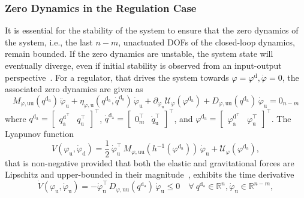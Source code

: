 \subsubsection{Zero Dynamics in the Regulation Case}
It is essential for the stability of the system to ensure that the zero dynamics of the system, i.e., the last $n-m$, unactuated \glspl{DOF} of the closed-loop dynamics, remain bounded. If the zero dynamics are unstable, the system state will eventually diverge, even if initial stability is observed from an input-output perspective~\citep{pustina2025analysis}.
For a regulator, that drives the system towards $\varphi = \varphi^\mathrm{d}, \dot{\varphi} = 0$, the associated zero dynamics are given as~\citep{pustina2025analysis}
\begin{equation}
    M_{\varphi,\mathrm{uu}}(q^{\mathrm{d}_\mathrm{a}}) \, \ddot{\varphi}_\mathrm{u} + \eta_{\varphi,\mathrm{u}}(q^{\mathrm{d}_\mathrm{a}},\dot{q}^{\mathrm{d}_\mathrm{a}}) \, \dot{\varphi}_\mathrm{u} + \partial_{\varphi_\mathrm{u}} \mathcal{U}_\varphi(\varphi^{\mathrm{d}_\mathrm{a}}) + D_{\varphi,\mathrm{uu}}(q^{\mathrm{d}_\mathrm{a}}) \, \dot{\varphi}_\mathrm{u} = 0_{n-m}
\end{equation}
where $q^{\mathrm{d}_\mathrm{a}} = \begin{bmatrix}
    q_\mathrm{a}^{\mathrm{d}^\top} & q_\mathrm{u}^{\top}
\end{bmatrix}^\top$, $\dot{q}^{\mathrm{d}_\mathrm{a}} = \begin{bmatrix}
    0_m^\top & \dot{q}_\mathrm{u}^{\top}
\end{bmatrix}^\top$, and $\varphi^{\mathrm{d}_\mathrm{a}} = \begin{bmatrix}
    \varphi_\mathrm{a}^{\mathrm{d}^\top} & \varphi_\mathrm{u}^{\top}
\end{bmatrix}^\top$.
The Lyapunov function
\begin{equation}
    V(\varphi_\mathrm{u},\dot{\varphi}_\mathrm{d}) = \frac{1}{2} \, \dot{\varphi}_\mathrm{u}^\top \, M_{\varphi,\mathrm{uu}}(h^{-1}(\varphi^{\mathrm{d}_\mathrm{a}})) \, \dot{\varphi}_\mathrm{u} + \mathcal{U}_\varphi(\varphi^{\mathrm{d}_\mathrm{a}}),
\end{equation}
that is non-negative provided that both the elastic and gravitational forces are Lipschitz and upper-bounded in their magnitude~\citep{pustina2025analysis}, exhibits the time derivative
\begin{equation}
    \dot{V}(\varphi_\mathrm{u},\dot{\varphi}_\mathrm{u}) = -\dot{\varphi}_\mathrm{u}^\top \, D_{\varphi,\mathrm{uu}}(q^{\mathrm{d}_\mathrm{a}}) \, \dot{\varphi}_\mathrm{u} \leq 0 \quad \forall \:  q^{\mathrm{d}_\mathrm{a}} \in \mathbb{R}^{n}, \dot{\varphi}_\mathrm{u} \in \mathbb{R}^{n-m},
\end{equation}

